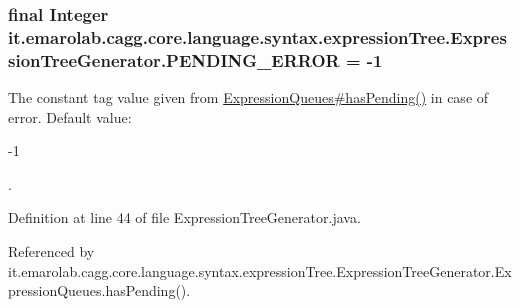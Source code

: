 \hypertarget{classit_1_1emarolab_1_1cagg_1_1core_1_1language_1_1syntax_1_1expressionTree_1_1ExpressionTreeGenerator_aa1cc8c563ef91ec7d8c42a38f91ac73a}{
\subsubsection[{P\-E\-N\-D\-I\-N\-G\-\_\-\-E\-R\-R\-O\-R}]{\setlength{\rightskip}{0pt plus 5cm}final Integer it.\-emarolab.\-cagg.\-core.\-language.\-syntax.\-expression\-Tree.\-Expression\-Tree\-Generator.\-P\-E\-N\-D\-I\-N\-G\-\_\-\-E\-R\-R\-O\-R = -\/1\hspace{0.3cm}{\ttfamily [static]}}}\label{classit_1_1emarolab_1_1cagg_1_1core_1_1language_1_1syntax_1_1expressionTree_1_1ExpressionTreeGenerator_aa1cc8c563ef91ec7d8c42a38f91ac73a}
The constant tag value given from \hyperlink{classit_1_1emarolab_1_1cagg_1_1core_1_1language_1_1syntax_1_1expressionTree_1_1ExpressionTreeGenerator_1_1ExpressionQueues_a3e49595a6682e2ca900f3813c126483d}{Expression\-Queues\#has\-Pending()} in case of error. Default value\-:
\begin{DoxyCode}
-1 
\end{DoxyCode}
 . 

Definition at line 44 of file Expression\-Tree\-Generator.\-java.



Referenced by it.\-emarolab.\-cagg.\-core.\-language.\-syntax.\-expression\-Tree.\-Expression\-Tree\-Generator.\-Expression\-Queues.\-has\-Pending().

